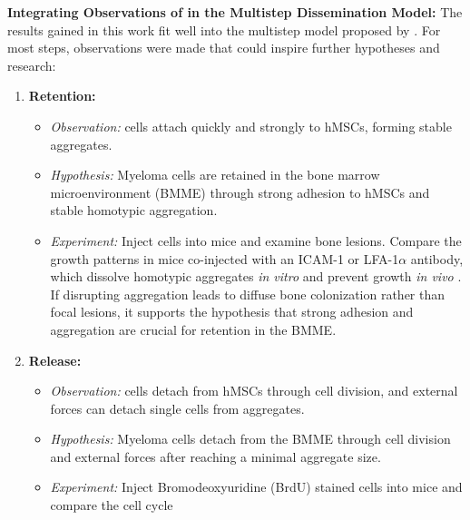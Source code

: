 \textbf{Integrating Observations of \INA in the Multistep Dissemination Model:}
The results gained in this work fit well into the multistep model proposed by
\citet{zeissigTumourDisseminationMultiple2020}. For most steps, observations
were made that could inspire further hypotheses and research:


\begin{enumerate}
    \item \textbf{Retention:}
          \begin{itemize}
              \item \textit{Observation:} \INA cells attach quickly and
                    strongly to \acp{hMSC}, forming stable aggregates.
              \item \textit{Hypothesis:} Myeloma cells are retained in the
                    bone marrow microenvironment (BMME) through strong adhesion to
                    \acp{hMSC} and stable homotypic aggregation.
              \item \textit{Experiment:} Inject \INA cells into mice and
                    examine bone lesions. Compare the growth patterns in mice
                    co-injected with an ICAM-1 or LFA-1$\alpha$ antibody, which
                    dissolve homotypic aggregates \textit{in vitro} and prevent
                    \INA growth \textit{in vivo}
                    \cite{kawanoHomotypicCellAggregations1991a,
                        klauszNovelFcengineeredHuman2017}. If disrupting aggregation
                    leads to diffuse bone colonization rather than focal lesions,
                    it supports the hypothesis that strong adhesion and
                    aggregation are crucial for retention in the \ac{BMME}.
          \end{itemize}
    \item \textbf{Release:}
          \begin{itemize}
              \item \textit{Observation:} \INA cells detach from \acp{hMSC}
                    through cell division, and external forces can detach single
                    cells from \INA aggregates.
              \item \textit{Hypothesis:} Myeloma cells detach from the BMME
                    through cell division and external forces after reaching a
                    minimal aggregate size.
              \item \textit{Experiment:} Inject Bromodeoxyuridine (BrdU)
                    stained \INA cells into mice and compare the cell cycle

\end{itemize}
\end{enumerate}
